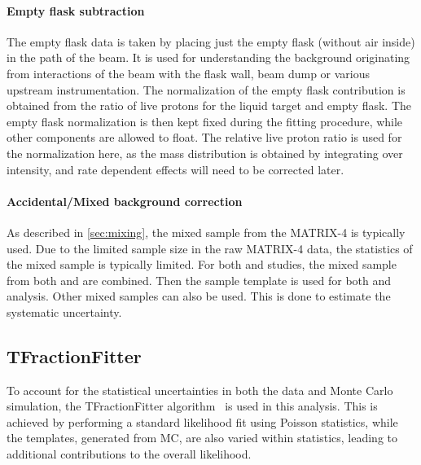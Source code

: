 \documentclass[../main.tex]{subfiles}
\begin{document}
\paragraph{Empty flask subtraction}
The empty flask data is taken by placing just the empty flask (without air inside) in the path of
the beam. It is used for understanding the background originating from interactions of the beam
with the flask wall, beam dump or various upstream instrumentation. The normalization of the
empty flask contribution is obtained from the ratio of live protons for the liquid target and
empty flask. The empty flask normalization is then kept fixed during the fitting procedure, while
other components are allowed to float. The relative live proton ratio is used for the normalization here, as the
mass distribution is obtained by integrating over intensity, and rate dependent effects will need
to be corrected later.

\paragraph{Accidental/Mixed background correction}
As described in \cref{sec:mixing}, the mixed sample from the MATRIX-4 is typically used.
Due to the limited sample size in the raw MATRIX-4 data,
the statistics of the mixed sample is typically limited. For both  and  studies,
the mixed sample from both  and  are combined.
Then the sample template is used for both  and  analysis.
Other mixed samples can also be used. This is done to estimate the systematic uncertainty.

\subsection{TFractionFitter}
To account for the statistical uncertainties in both the data and Monte Carlo
simulation, the TFractionFitter algorithm~\cite{barlow1993} is used in this analysis.
This is achieved by performing a standard likelihood fit using Poisson statistics,
while the templates, generated from MC, are also varied within statistics, leading
to additional contributions to the overall likelihood.
\end{document}
